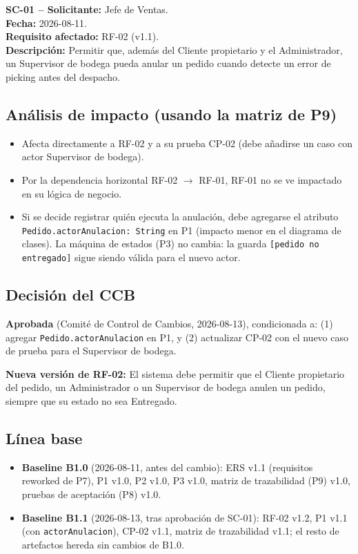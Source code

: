 \documentclass[12pt,a4paper]{article}
\begin{document}
    \textbf{SC-01 -- Solicitante:} Jefe de Ventas.\\
    \textbf{Fecha:} 2026-08-11.\\
    \textbf{Requisito afectado:} RF-02 (v1.1).\\
    \textbf{Descripción:} Permitir que, además del Cliente propietario y el Administrador, un Supervisor de bodega pueda anular un pedido cuando detecte un error de picking antes del despacho.
    
    \subsection*{Análisis de impacto (usando la matriz de P9)}
    
    \begin{itemize}[leftmargin=*]
        \item Afecta directamente a RF-02 y a su prueba CP-02 (debe añadirse un caso con actor Supervisor de bodega).
        \item Por la dependencia horizontal RF-02 $\rightarrow$ RF-01, RF-01 no se ve impactado en su lógica de negocio.
        \item Si se decide registrar quién ejecuta la anulación, debe agregarse el atributo \texttt{Pedido.actorAnulacion: String} en P1 (impacto menor en el diagrama de clases). La máquina de estados (P3) no cambia: la guarda \texttt{[pedido no entregado]} sigue siendo válida para el nuevo actor.
    \end{itemize}
    
    \subsection*{Decisión del CCB}
    
    \textbf{Aprobada} (Comité de Control de Cambios, 2026-08-13), condicionada a: (1) agregar \texttt{Pedido.actorAnulacion} en P1, y (2) actualizar CP-02 con el nuevo caso de prueba para el Supervisor de bodega.
    
    \textbf{Nueva versión de RF-02:} El sistema debe permitir que el Cliente propietario del pedido, un Administrador o un Supervisor de bodega anulen un pedido, siempre que su estado no sea Entregado.
    
    \subsection*{Línea base}
    
    \begin{itemize}[leftmargin=*]
        \item \textbf{Baseline B1.0} (2026-08-11, antes del cambio): ERS v1.1 (requisitos reworked de P7), P1 v1.0, P2 v1.0, P3 v1.0, matriz de trazabilidad (P9) v1.0, pruebas de aceptación (P8) v1.0.
        \item \textbf{Baseline B1.1} (2026-08-13, tras aprobación de SC-01): RF-02 v1.2, P1 v1.1 (con \texttt{actorAnulacion}), CP-02 v1.1, matriz de trazabilidad v1.1; el resto de artefactos hereda sin cambios de B1.0.
    \end{itemize}
    
    
\end{document}
